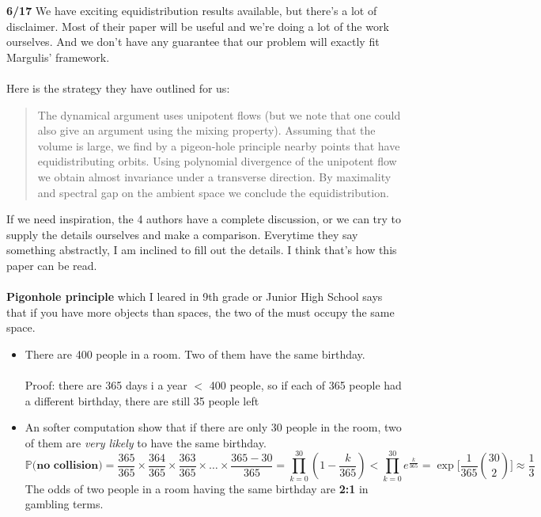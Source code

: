 \documentclass[12pt]{article}
\begin{document}
\newpage

\noindent \textbf{6/17} We have exciting equidistribution results available, but there's a lot of disclaimer.  Most of their paper will be useful and we're doing a lot of the work ourselves.  And we don't have any guarantee that our problem will exactly fit Margulis' framework. \\ \\
Here is the strategy they have outlined for us:
\begin{quotation}
The dynamical argument uses {\color{red!50!yellow}unipotent flows} 
(but we note that one could also give an argument using the mixing property). 
Assuming that the volume is large, we find by a {\color{blue}pigeon-hole principle}
nearby points that have equidistributing orbits. Using {\color{purple}polynomial divergence} of the unipotent flow we obtain almost invariance under a transverse direction. By {\color{green}maximality} and {\color{green}spectral gap} on the ambient space we conclude the equidistribution.
\end{quotation}
If we need inspiration, the 4 authors have a complete discussion, or we can try to supply the details ourselves and make a comparison.  Everytime they say something abstractly, I am inclined to fill out the details.  I think that's how this paper can be read.  \\ \\
\textbf{Pigonhole principle} which I leared in 9th grade or Junior High School says that if you have more objects than spaces, the two of the must occupy the same space. 
\begin{itemize}
\item There are 400 people in a room.  Two of them have the same birthday.  \\ \\ Proof: there are 365 days i a year $<$ 400 people, so if each of 365 people had a different birthday, there are still 35 people left 
\item An softer computation show that if there are only 30 people in the room, two of them are \textit{very likely} to have the same birthday.
$$ \mathbb{P} \big( \textbf{no collision} \big) = \frac{365}{365} \times \frac{364}{365} \times \frac{363}{365} \times \dots \times \frac{365-30}{365} = \prod_{k=0}^{30} \left( 1 - \frac{k}{365}\right) 
< \prod_{k=0}^{30} e^{\frac{k}{365}} =  \exp \Big[ \frac{1}{365}\binom{30}{2} \Big] \approx \frac{1}{3}$$
The odds of two people in a room having the same birthday are \textbf{2:1} in gambling terms.
\end{itemize}
\end{document}
